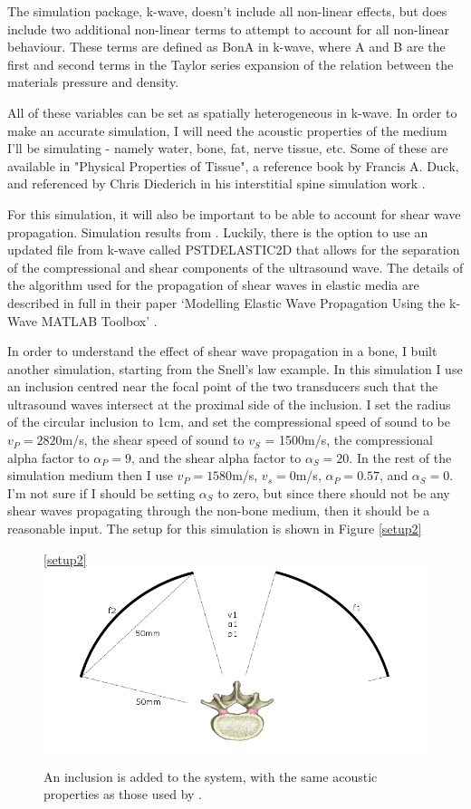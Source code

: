 \documentclass[10pt,a4paper]{article}
\begin{document}
The simulation package, k-wave, doesn't include all non-linear effects, but does include two additional non-linear terms to attempt to account for all non-linear behaviour. These terms are defined as BonA in k-wave, where A and B are the first and second terms in the Taylor series expansion of the relation between the materials pressure and density.

All of these variables can be set as spatially heterogeneous in k-wave. In order to make an accurate simulation, I will need the acoustic properties of the medium I'll be simulating - namely water, bone, fat, nerve tissue, etc. Some of these are available in "Physical Properties of Tissue", a reference book by Francis A. Duck, and referenced by Chris Diederich in his interstitial spine simulation work \cite{duck1990physical}.

For this simulation, it will also be important to be able to account for shear wave propagation. Simulation results from \cite{treeby2015contribution}. Luckily, there is the option to use an updated file from k-wave called PSTDELASTIC2D that allows for the separation of the compressional and shear components of the ultrasound wave. The details of the algorithm used for the propagation of shear waves in elastic media are described in full in their paper `Modelling Elastic Wave Propagation Using the k-Wave MATLAB Toolbox' \cite{treeby2014modelling}. 



In order to understand the effect of shear wave propagation in a bone, I built another simulation, starting from the Snell's law example. In this simulation I use an inclusion centred near the focal point of the two transducers such that the ultrasound waves intersect at the proximal side of the inclusion. I set the radius of the circular inclusion to 1cm, and set the compressional speed of sound to be $v_P = 2820$m/s, the shear speed of sound to $v_S$ = 1500m/s, the compressional alpha factor to $\alpha_P = 9$, and the shear alpha factor to $\alpha_S = 20$. In the rest of the simulation medium then I use $v_P = 1580$m/s, $v_s = 0$m/s, $\alpha_P = 0.57$, and $\alpha_S = 0$. I'm not sure if I should be setting $\alpha_S$ to zero, but since there should not be any shear waves propagating through the non-bone medium, then it should be a reasonable input. The setup for this simulation is shown in Figure \ref{setup2}
\begin{figure}[H] \ref{setup2}
\centering
\includegraphics[scale=0.5]{setup2}
\caption{An inclusion is added to the system, with the same acoustic properties as those used by \cite{treeby2015contribution}.}
\end{figure}
\end{document}
